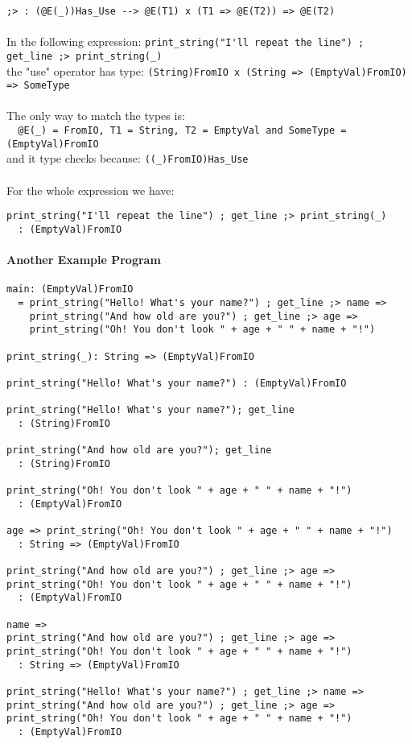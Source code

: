 \documentclass[diploma]{softlab-thesis}
\begin{document}
\verb|;> : (@E(_))Has_Use --> @E(T1) x (T1 => @E(T2)) => @E(T2)|
\\\\
In the following expression:
\verb|print_string("I'll repeat the line") ; get_line ;> print_string(_)|
\\
the "use" operator has type:
\verb|(String)FromIO x (String => (EmptyVal)FromIO) => SomeType|
\\\\
The only way to match the types is:
\\
\verb|  @E(_) = FromIO, T1 = String, T2 = EmptyVal and SomeType = (EmptyVal)FromIO|
\\
and it type checks because: \verb|((_)FromIO)Has_Use|
\\\\
For the whole expression we have:
\begin{verbatim}
print_string("I'll repeat the line") ; get_line ;> print_string(_)
  : (EmptyVal)FromIO
\end{verbatim}

\newpage
\paragraph{Another Example Program}
\begin{verbatim}
main: (EmptyVal)FromIO
  = print_string("Hello! What's your name?") ; get_line ;> name =>
    print_string("And how old are you?") ; get_line ;> age =>
    print_string("Oh! You don't look " + age + " " + name + "!")

print_string(_): String => (EmptyVal)FromIO

print_string("Hello! What's your name?") : (EmptyVal)FromIO

print_string("Hello! What's your name?"); get_line
  : (String)FromIO

print_string("And how old are you?"); get_line
  : (String)FromIO

print_string("Oh! You don't look " + age + " " + name + "!")
  : (EmptyVal)FromIO

age => print_string("Oh! You don't look " + age + " " + name + "!")
  : String => (EmptyVal)FromIO

print_string("And how old are you?") ; get_line ;> age =>
print_string("Oh! You don't look " + age + " " + name + "!")
  : (EmptyVal)FromIO

name =>
print_string("And how old are you?") ; get_line ;> age =>
print_string("Oh! You don't look " + age + " " + name + "!")
  : String => (EmptyVal)FromIO

print_string("Hello! What's your name?") ; get_line ;> name =>
print_string("And how old are you?") ; get_line ;> age =>
print_string("Oh! You don't look " + age + " " + name + "!")
  : (EmptyVal)FromIO
\end{verbatim}
\end{document}
